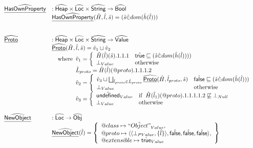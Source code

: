 \documentclass{article}
\makeatletter
\newcommand{\SF}[1]{\mbox{\textsf{#1}}}
\newcommand{\wherec}[1]{{\rm where}\begin{array}[t]{l}#1\end{array}}
\newcommand{\ifc}[1]{{\rm if}\begin{array}[t]{l}#1\end{array}}
\newcommand{\owc}{{\rm otherwise}}
\newcommand{\abs}[1]{\widehat{\SF{#1}}}
\newcommand{\aHeap}{\abs{Heap}}
\newcommand{\aLoc}{\abs{Loc}}
\newcommand{\aObj}{\abs{Obj}}
\newcommand{\aValue}{\abs{Value}}
\newcommand{\set}[1]{\left\{\begin{array}{l}#1\end{array}\right\}}
\newcommand{\ahf}[1]{\widehat{\underline{\sf #1}}}
\newcommand{\varprop}[1]{@#1}
\newcommand{\atrue}{\hat{\SF{true}}}
\newcommand{\afalse}{\hat{\SF{false}}}
\newcommand{\aundef}{\hat{\SF{undefined}}}
\makeatother
\begin{document}
\[\begin{array}{ll}
\ahf{HasOwnProperty} & : \aHeap \times \aLoc \times \abs{String} \rightarrow \abs{Bool} \\
&  \ahf{HasOwnProperty}(\hat{H},\hat{l},\hat{s}) = (\hat{s} \dot{\in} dom(\hat{h}(\hat{l})))\\
\\\\
\ahf{Proto} & : \aHeap \times \aLoc \times \abs{String} \rightarrow \aValue\\
  & \ahf{Proto}(\hat{H},\hat{l},\hat{s})
    =\hat{v}_1\sqcup\hat{v}_2\\
  & \quad\wherec{
     \hat{v}_1 =
        \left\{
          \begin{array}{ll}
            \hat{H}(\hat{l})(\hat{s}).1.1.1
            & \atrue\sqsubseteq(\hat{s} \dot{\in} dom(\hat{h}(\hat{l}))))\\
            \bot_{Value} & \owc \\
          \end{array}
        \right.\\
      \hat{L}_{proto} = \hat{H}(\hat{l})(\varprop{proto}).1.1.1.2\\
      \hat{v}_2 =
        \left\{
          \begin{array}{ll}
            \hat{v}_3 \sqcup \bigsqcup_{\hat{l}_{proto}\in\hat{L}_{proto}}\ahf{Proto}(\hat{H},\hat{l}_{proto},\hat{s})
            & \afalse\sqsubseteq(\hat{s} \dot{\in} dom(\hat{h}(\hat{l})))\\
            \bot_{Value} & \owc \\
          \end{array}
        \right.\\
    \hat{v}_3 =
      \left\{
      \begin{array}{ll}
        \aundef_{Value} & \ifc{\hat{H}(\hat{l}_1)(\varprop{proto}).1.1.1.1.2 \not\sqsubseteq \bot_{Null}}\\
        \bot_{Value} & \owc\\
      \end{array}
    \right.\\
    }\\
\\

\ahf{NewObject} & : \aLoc \rightarrow \aObj \\
& \ahf{NewObject}(\hat{l}) = \set{\varprop{class}\mapsto \hat{``Object"}_{Value},\\
  \varprop{proto}\mapsto
   \langle \langle\bot_{PValue},\{\hat{l}\}\rangle,\afalse,\afalse,\afalse \rangle,\\
  \varprop{extensible}\mapsto \atrue_{Value}
  }\\\\


\end{array}\]
\end{document}
